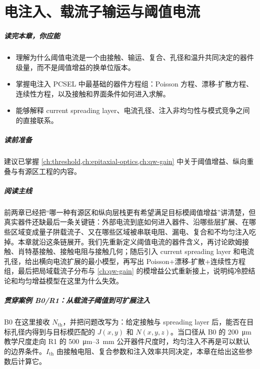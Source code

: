 ﻿%
\chapter{电注入、载流子输运与阈值电流}
\label{ch:electrical}

\paragraph{读完本章，你应能}
\begin{itemize}
  \item 理解为什么阈值电流是一个由接触、输运、复合、孔径和温升共同决定的器件级量，而不是阈值增益的换单位版本。
  \item 掌握电注入 PCSEL 中最基础的器件方程组：Poisson 方程、漂移-扩散方程、连续性方程，以及接触和界面条件如何进入求解。
  \item 能够解释 current spreading layer、电流孔径、注入非均匀性与模式竞争之间的直接联系。
\end{itemize}

\paragraph{读前准备}
建议已掌握 \cref{ch:threshold,ch:epitaxial-optics,ch:qw-gain} 中关于阈值增益、纵向重叠与有源区工程的内容。

\paragraph{阅读主线}
前两章已经把“哪一种有源区和纵向层栈更有希望满足目标模阈值增益”讲清楚，但真实器件还缺最后一条关键链：外部电流到底如何进入器件、沿哪些层扩展、在哪些区域变成量子阱载流子、又在哪些区域被串联电阻、漏电、复合和不均匀注入吃掉。本章就沿这条链展开。我们先重新定义阈值电流的器件含义，再讨论欧姆接触、肖特基接触、接触电阻与接触几何；随后引入 current spreading layer 和电流孔径，给出横向电流扩展的最小模型，再写出 Poisson+漂移-扩散+连续性方程组，最后把局域载流子分布与 \cref{ch:qw-gain} 的模增益公式重新接上，说明纯冷腔结论和均匀增益模型在这里为什么失效。

\paragraph{贯穿案例 B0/R1：从载流子阈值到可扩展注入}
B0 在这里接收 $N_{\mathrm{th}}$，并把问题改写为：给定接触与 spreading layer 后，能否在目标孔径内得到与目标模匹配的 $J(x,y)$ 和 $N(x,y,z)$。当口径从 B0 的 \SI{200}{\micro\meter} 教学尺度走向 R1 的 \SI{500}{\micro\meter}--\SI{3}{mm} 公开器件尺度时，均匀注入不再是可以默认的边界条件。$I_{\mathrm{th}}$ 由接触电阻、复合参数和注入效率共同决定，本章在给出这些参数后计算它。

